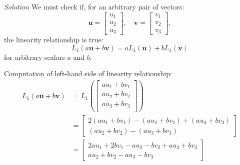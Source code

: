 \documentclass[12pt]{article}
\begin{document}
\emph{Solution}
We must check if, for an arbitrary pair of vectors:
\[
\mathbf{u}=\begin{bmatrix} u_1\\ u_2\\ u_3\end{bmatrix},\quad
\mathbf{v}=\begin{bmatrix} v_1\\ v_2\\ v_3\end{bmatrix},
\]
the linearity relationship is true:
\[
L_1(a\mathbf{u}+b\mathbf{v})=aL_1(\mathbf{u})+bL_1(\mathbf{v})
\]
for arbitrary scalars $a$ and $b$.

Computation of left-hand side of linearity relationship:
\begin{align*}
L_1(a\mathbf{u}+b\mathbf{v})&=
L_1\left(\begin{bmatrix} au_1+bv_1\\ au_2+bv_2\\ au_3+bv_3\\ \end{bmatrix}\right)\\
&=\begin{bmatrix}
2(au_1+bv_1)-(au_2+bv_2)+(au_3+bv_3)\\
(au_2+bv_2) - (au_3+bv_3)
\end{bmatrix}\\
&=\begin{bmatrix}
2au_1+2bv_1-au_2-bv_2+au_3+bv_3\\
au_2+bv_2 - au_3-bv_3
\end{bmatrix}
\end{align*}
\end{document}

